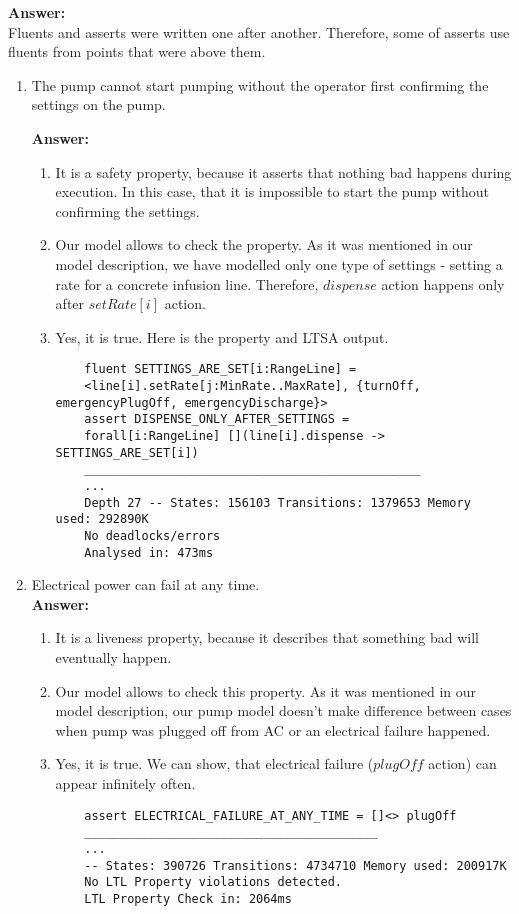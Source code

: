 \documentclass{article}
\begin{document}
\textbf{Answer: } 
\\Fluents and asserts were written one after another. Therefore, some of asserts use fluents from points that were above them.

\begin{enumerate}
    \item The pump cannot start pumping without the operator first confirming the settings on the pump.
    
    \textbf{Answer:}
    \begin{enumerate}
    \item It is a safety property, because it asserts that nothing bad happens during execution. In this case, that it is
    impossible to start the pump without confirming the settings.
    \item  Our model allows to check the property. As it was mentioned in our model description, we have modelled only one
    type of settings - setting a rate for a concrete infusion line. Therefore, $dispense$ action happens only after
    $setRate[i]$ action.
    \item Yes, it is true. Here is the property and LTSA output.
	\begin{verbatim}
	fluent SETTINGS_ARE_SET[i:RangeLine] = 
	<line[i].setRate[j:MinRate..MaxRate], {turnOff, emergencyPlugOff, emergencyDischarge}>
	assert DISPENSE_ONLY_AFTER_SETTINGS = 
	forall[i:RangeLine] [](line[i].dispense -> SETTINGS_ARE_SET[i])
	_______________________________________________
	...
	Depth 27 -- States: 156103 Transitions: 1379653 Memory used: 292890K
	No deadlocks/errors
	Analysed in: 473ms
	\end{verbatim}    
    \end{enumerate}
    
    \item Electrical power can fail at any time.\\
    \textbf{Answer:}
    \begin{enumerate}
    \item It is a liveness property, because it describes that something bad will eventually happen.
    \item Our model allows to check this property. As it was mentioned in our model description, our pump model doesn't make
    difference between cases when pump was plugged off from AC or an electrical failure happened.
    \item Yes, it is true. We can show, that electrical failure ($plugOff$ action) can appear infinitely often.
    \begin{verbatim}
    assert ELECTRICAL_FAILURE_AT_ANY_TIME = []<> plugOff
    _________________________________________
    ...
    -- States: 390726 Transitions: 4734710 Memory used: 200917K
    No LTL Property violations detected.
    LTL Property Check in: 2064ms
    \end{verbatim}
    \end{enumerate}
     


\end{enumerate}
\end{document}

